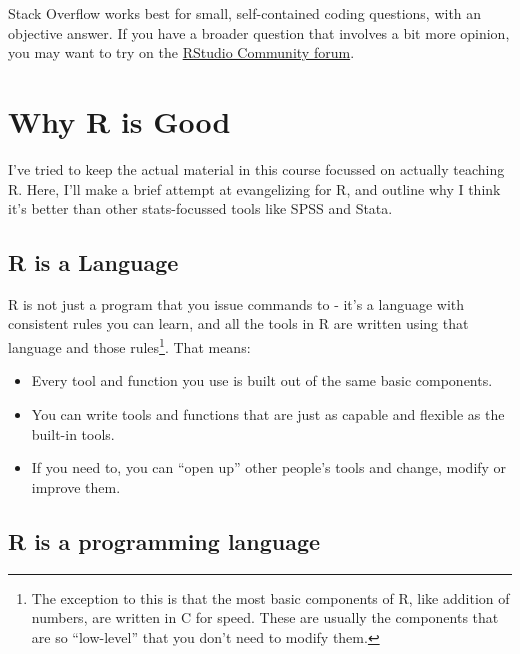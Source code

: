\documentclass[
]{book}
\providecommand{\tightlist}{%
  \setlength{\itemsep}{0pt}\setlength{\parskip}{0pt}}
\begin{document}
Stack Overflow works best for small, self-contained coding questions, with an objective
answer. If you have a broader question that involves a bit more opinion,
you may want to try on the \href{https://community.rstudio.com/}{RStudio Community forum}.

\hypertarget{why-r-is-good}{%
\chapter*{Why R is Good}\label{why-r-is-good}}

I've tried to keep the actual material in this course focussed on actually
teaching R. Here, I'll make a brief attempt at evangelizing for R, and
outline why I think it's better than other stats-focussed tools
like SPSS and Stata.

\hypertarget{r-is-a-language}{%
\section*{R is a Language}\label{r-is-a-language}}

R is not just a program that you issue commands to - it's a language with
consistent rules you can learn, and all the tools in R are written using that
language and those rules\footnote{The exception to this is that the most basic components
  of R, like addition of numbers, are written in C for speed. These are
  usually the components that are so ``low-level'' that you don't need
  to modify them.}. That means:

\begin{itemize}
\tightlist
\item
  Every tool and function you use is built out of the same basic components.
\item
  You can write tools and functions that are just as capable and flexible
  as the built-in tools.
\item
  If you need to, you can ``open up'' other people's tools and change,
  modify or improve them.
\end{itemize}

\hypertarget{r-is-a-programming-language}{%
\section*{R is a programming language}\label{r-is-a-programming-language}}
\end{document}
